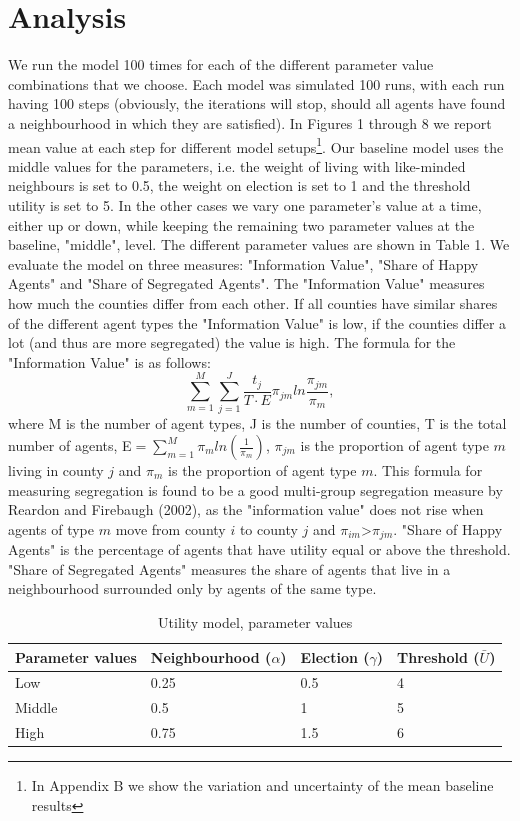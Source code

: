 \documentclass[12pt, a4paper]{article}
\begin{document}
	\section{\label{sec_res}Analysis}
	We run the model 100 times for each of the different parameter value combinations that we choose. Each model was simulated 100 runs, with each run having 100 steps (obviously, the iterations will stop, should all agents have found a neighbourhood in which they are satisfied). In Figures 1 through 8 we report mean value at each step for different model setups\footnote{In Appendix B we show the variation and uncertainty of the mean baseline results}. Our baseline model uses the middle values for the parameters, i.e. the weight of living with like-minded neighbours is set to 0.5, the weight on election is set to 1 and the threshold utility is set to 5. In the other cases we vary one parameter's value at a time, either up or down, while keeping the remaining two parameter values at the baseline, "middle", level. The different parameter values are shown in Table 1. We evaluate the model on three measures: "Information Value", "Share of Happy Agents" and "Share of Segregated Agents". The "Information Value" measures how much the counties differ from each other. If all counties have similar shares of the different agent types the "Information Value" is low, if the counties differ a lot (and thus are more segregated) the value is high. The formula for the "Information Value" is as follows: \newline
	$$\sum_{m=1}^{M}\sum_{j=1}^{J}\frac{t_j}{T \cdot E}\pi_{jm}ln\frac{\pi_{jm}}{\pi_m},$$ where M is the number of agent types, J is the number of counties, T is the total number of agents, E$=\sum_{m=1}^{M}\pi_m ln(\frac{1}{\pi_m})$, $\pi_{jm}$ is the proportion of agent type $m$ living in county $j$ and $\pi_m$ is the proportion of agent type $m$. This formula for measuring segregation is found to be a good multi-group segregation measure by Reardon and Firebaugh (2002), as the "information value" does not rise when agents of type $m$ move from county $i$ to county $j$ and $\pi_{im}$\textgreater$\pi_{jm}$. "Share of Happy Agents" is the percentage of agents that have utility equal or above the threshold. "Share of Segregated Agents" measures the share of agents that live in a neighbourhood surrounded only by agents of the same type.
	
	\begin{table}[ht]
		\centering
		\caption{Utility model, parameter values}
		\begin{tabular}{llll}
			\hline
			Parameter values & Neighbourhood ($\alpha$) & Election ($\gamma$) & Threshold ($\bar{U}$) \\ 
			\hline \hline
			Low & 0.25 & 0.5 & 4 \\ 
			Middle & 0.5 & 1 & 5 \\ 
			High & 0.75 & 1.5 & 6 \\ \hline
			\hline
		\end{tabular}
	\end{table}
	
\end{document}
